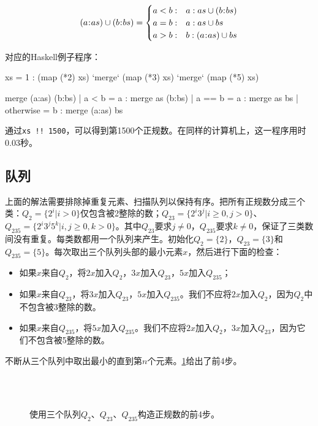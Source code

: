 \documentclass[b5paper]{ctexart}
\begin{document}
\[
(a \cons as) \cup (b \cons bs) = \begin{cases}
  a < b: & a : as \cup (b \cons bs) \\
  a = b: & a : as \cup bs \\
  a > b: & b : (a \cons as) \cup bs \\
\end{cases}
\]

对应的Haskell例子程序：
\begin{Haskell}
xs = 1 : (map (*2) xs) `merge` (map (*3) xs) `merge` (map (*5) xs)

merge (a:as) (b:bs) | a < b = a : merge as (b:bs)
                    | a == b = a : merge as bs
                    | otherwise = b : merge (a:as) bs
\end{Haskell}

通过\texttt{xs !! 1500}，可以得到第1500个正规数。在同样的计算机上，这一程序用时0.03秒。

\subsection*{队列}
上面的解法需要排除掉重复元素、扫描队列以保持有序。把所有正规数分成三个类：$Q_2 = \{2^i | i > 0\}$仅包含被2整除的数；$Q_{23} = \{ 2^i3^j | i \geq 0, j > 0 \}$、$Q_{235} = \{ 2^i3^j5^k | i,j \geq 0, k > 0\}$。其中$Q_{23}$要求$j \neq 0$，$Q_{235}$要求$k \neq 0$，保证了三类数间没有重复。每类数都用一个队列来产生。初始化$Q_2=\{ 2 \}$，$Q_{23} = \{ 3 \}$和$Q_{235} = \{ 5 \}$。每次取出三个队列头部的最小元素$x$，然后进行下面的检查：

\begin{itemize}
\item 如果$x$来自$Q_2$，将$2x$加入$Q_2$，$3x$加入$Q_{23}$，$5x$加入$Q_{235}$；
\item 如果$x$来自$Q_{23}$，将$3x$加入$Q_{23}$，$5x$加入$Q_{235}$。我们不应将$2x$加入$Q_2$，因为$Q_2$中不包含被3整除的数。
\item 如果$x$来自$Q_{235}$，将$5x$加入$Q_{235}$。我们不应将$2x$加入$Q_2$，$3x$加入$Q_{23}$，因为它们不包含被5整除的数。
\end{itemize}

不断从三个队列中取出最小的直到第$n$个元素。\cref{fig:q235}给出了前4步。

\begin{figure}[htbp]
  \centering
   \\
   \\
  \caption{使用三个队列$Q_2$、$Q_{23}$、$Q_{235}$构造正规数的前4步。}
  \label{fig:q235}
\end{figure}
\end{document}
